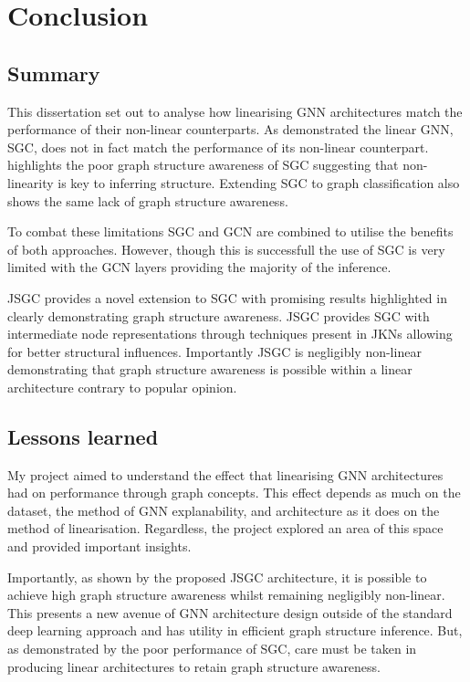 \chapter{Conclusion}

\section{Summary}
This dissertation set out to analyse how linearising GNN architectures match the performance of their non-linear counterparts.
As  demonstrated the linear GNN, SGC, does not in fact match the performance of its non-linear counterpart.
 highlights the poor graph structure awareness of SGC suggesting that non-linearity is key to inferring structure.
Extending SGC to graph classification also shows the same lack of graph structure awareness.

To combat these limitations SGC and GCN are combined to utilise the benefits of both approaches.
However, though this is successfull the use of SGC is very limited with the GCN layers providing the majority of the inference.

JSGC provides a novel extension to SGC with promising results highlighted in  clearly demonstrating graph structure awareness.
JSGC provides SGC with intermediate node representations through techniques present in JKNs\cite{xu2018representation} allowing for better structural influences.
Importantly JSGC is negligibly non-linear demonstrating that graph structure awareness is possible within a linear architecture contrary to popular opinion.

\section{Lessons learned}
My project aimed to understand the effect that linearising GNN architectures had on performance through graph concepts.
This effect depends as much on the dataset, the method of GNN explanability, and architecture as it does on the method of linearisation.
Regardless, the project explored an area of this space and provided important insights.

Importantly, as shown by the proposed JSGC architecture, it is possible to achieve high graph structure awareness whilst remaining negligibly non-linear.
This presents a new avenue of GNN architecture design outside of the standard deep learning approach and has utility in efficient graph structure inference.
But, as demonstrated by the poor performance of SGC, care must be taken in producing linear architectures to retain graph structure awareness.

